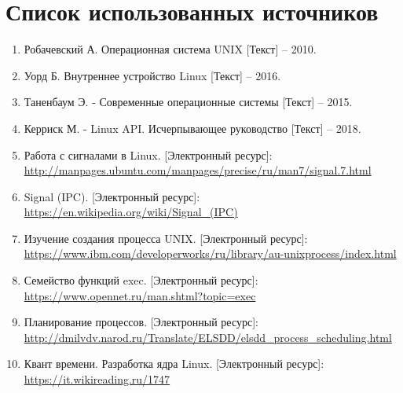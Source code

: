 \section*{Список использованных источников}

\begin{enumerate}
	\item Робачевский А. Операционная система UNIX [Текст] -- 2010.
	\item Уорд Б. Внутреннее устройство Linux [Текст] -- 2016.
	\item Таненбаум Э. - Современные операционные системы [Текст] -- 2015.
	\item Керриск М. - Linux API. Исчерпывающее руководство [Текст] -- 2018.
	\item Работа с сигналами в Linux. [Электронный ресурс]:\\
		{\small\url{http://manpages.ubuntu.com/manpages/precise/ru/man7/signal.7.html}} 
	\item Signal (IPC). [Электронный ресурс]:\\
		{\small\url{https://en.wikipedia.org/wiki/Signal_(IPC)}}
	\item Изучение создания процесса UNIX. [Электронный ресурс]:\\
		{\small\url{https://www.ibm.com/developerworks/ru/library/au-unixprocess/index.html}}
	\item Семейство функций exec. [Электронный ресурс]:\\
		{\small\url{https://www.opennet.ru/man.shtml?topic=exec}}
	\item Планирование процессов. [Электронный ресурс]:\\
		{\small\url{http://dmilvdv.narod.ru/Translate/ELSDD/elsdd_process_scheduling.html}}
	\item Квант времени. Разработка ядра Linux. [Электронный ресурс]:\\
		{\small\url{https://it.wikireading.ru/1747}}
\end{enumerate}

\newpage

